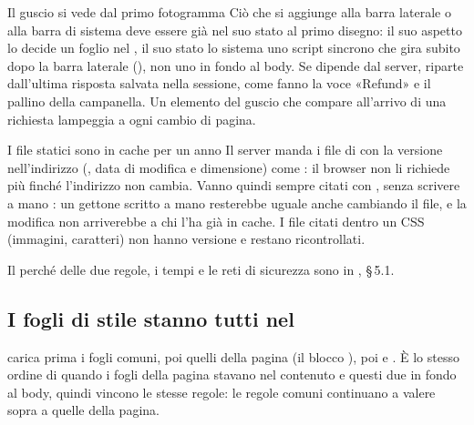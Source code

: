 \begin{attenzione}{Il guscio si vede dal primo fotogramma}
Ciò che si aggiunge alla barra laterale o alla barra di sistema deve essere
già nel suo stato al primo disegno: il suo aspetto lo decide un foglio nel
, il suo stato lo sistema uno script sincrono che gira subito
dopo la barra laterale (), non uno in fondo al body. Se
dipende dal server, riparte dall'ultima risposta salvata nella sessione,
come fanno la voce «Refund» e il pallino della campanella. Un elemento del
guscio che compare all'arrivo di una richiesta lampeggia a ogni cambio di
pagina.
\end{attenzione}

\begin{attenzione}{I file statici sono in cache per un anno}
Il server manda i file di  con la versione nell'indirizzo
(, data di modifica e dimensione) come : il browser
non li richiede più finché l'indirizzo non cambia. Vanno quindi sempre
citati con , senza scrivere a mano
: un gettone scritto a mano resterebbe uguale anche cambiando il file,
e la modifica non arriverebbe a chi l'ha già in cache. I file citati dentro
un CSS (immagini, caratteri) non hanno versione e restano ricontrollati.
\end{attenzione}

\noindent
Il perché delle due regole, i tempi e le reti di sicurezza sono in
, \S\,5.1.

\subsection{I fogli di stile stanno tutti nel \texorpdfstring{}{head}}\label{sez:fogli-nel-head}

 carica prima i fogli comuni, poi quelli della pagina (il
blocco ), poi  e . È lo
stesso ordine di quando i fogli della pagina stavano nel contenuto e questi
due in fondo al body, quindi vincono le stesse regole: le regole comuni
continuano a valere sopra a quelle della pagina.


